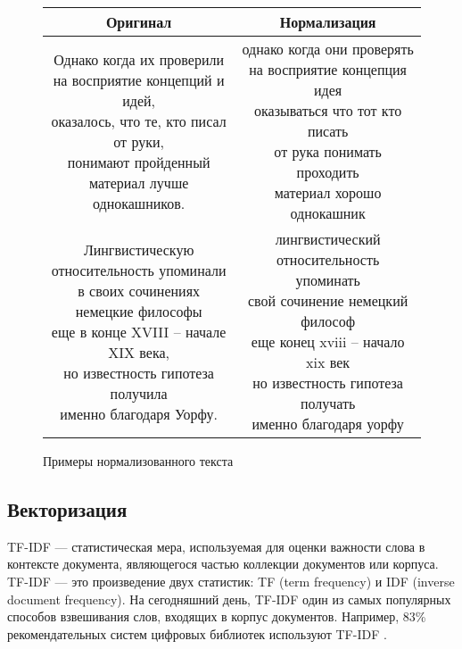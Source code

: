 \documentclass[a4paper, 14pt]{extarticle}
\begin{document}
\begin{figure}
	\centering
	{ %
		\begin{tabular}{|c|c|}
			\hline
			Оригинал  & Нормализация \\ \hline\hline
			\makecell{Однако когда их проверили\\ на восприятие концепций и идей,\\ оказалось, что те, кто писал от руки,\\ понимают пройденный \\материал лучше однокашников.} & \makecell{однако когда они проверять\\ на восприятие концепция идея\\ оказываться что тот кто писать\\ от рука понимать проходить\\ материал хорошо однокашник}
			\\ \hline
			\makecell{Лингвистическую относительность упоминали\\ в своих сочинениях немецкие философы\\ еще в конце XVIII – начале XIX века, \\но известность гипотеза получила\\ именно благодаря Уорфу.} & \makecell{лингвистический относительность упоминать \\свой сочинение немецкий философ \\еще конец xviii – начало xix век \\но известность гипотеза получать\\ именно благодаря уорфу} \\ \hline
		\end{tabular}
	}
	\caption{Примеры нормализованного текста}
	\label{exa}
\end{figure}


\subsection{Векторизация}

TF-IDF \cite{doi:10.1108/eb026526} --- статистическая мера, используемая для оценки важности слова в контексте 
документа, являющегося частью коллекции документов или корпуса.
TF-IDF --- это произведение двух статистик: TF (term frequency) и IDF (inverse 
document frequency). На сегодняшний день, TF-IDF один из самых популярных способов взвешивания слов, входящих в корпус документов.
Например, 83\% рекомендательных систем цифровых библиотек используют TF-IDF \cite{Beel2016}.
\end{document}
